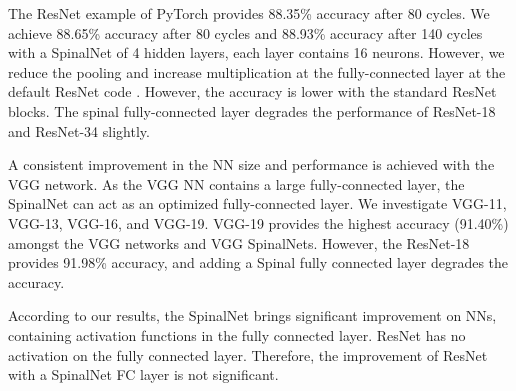 \documentclass[journal]{IEEEtran}
\begin{document}
The ResNet \cite{ResNet_code} example of PyTorch provides 88.35\% accuracy after 80 cycles. We achieve 88.65\% accuracy after 80 cycles and 88.93\% accuracy after 140 cycles with a SpinalNet of 4 hidden layers, each layer contains 16 neurons. However, we reduce the pooling and increase multiplication at the fully-connected layer at the default ResNet code \cite{ResNet_code}. However, the accuracy is lower with the standard ResNet blocks. The spinal fully-connected layer degrades the performance of ResNet-18 and ResNet-34 slightly. 

A consistent improvement in the NN size and performance is achieved with the VGG network. As the VGG NN contains a large fully-connected layer, the SpinalNet can act as an optimized fully-connected layer. We investigate VGG-11, VGG-13, VGG-16, and VGG-19. VGG-19 provides the highest accuracy (91.40\%) amongst the VGG networks and VGG SpinalNets. However, the ResNet-18 provides 91.98\% accuracy, and adding a Spinal fully connected layer degrades the accuracy.

According to our results, the SpinalNet brings significant improvement on NNs, containing activation functions in the fully connected layer. ResNet has no activation on the fully connected layer. Therefore, the improvement of ResNet with a SpinalNet FC layer is not significant. 
\end{document}
